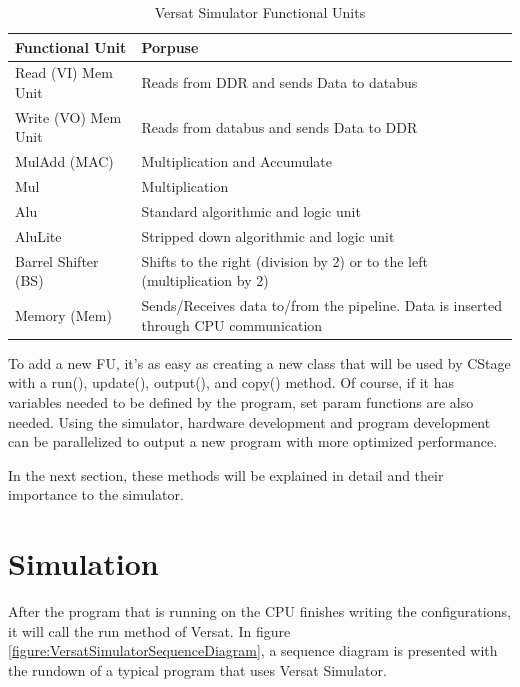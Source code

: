 \begin{table}[!htbp]
    \centering
    \begin{tabular}{|ll|}
        \hline
        \textbf{Functional Unit}     & \textbf{Porpuse}  \\  \hline
        Read (VI) Mem Unit             & Reads from DDR and sends Data to databus            \\ \hline
        Write (VO) Mem Unit & Reads from databus and sends Data to DDR             \\ \hline
        MulAdd (MAC)    & Multiplication and Accumulate          \\ \hline
		Mul    & Multiplication     \\ \hline
		Alu    & Standard algorithmic and logic unit     \\ \hline
		AluLite    & Stripped down  algorithmic and logic unit     \\ \hline
		Barrel Shifter (BS) & Shifts to the right (division by 2) or to the left (multiplication by 2) \\ \hline
		Memory (Mem) & Sends/Receives data to/from the pipeline. Data is inserted through CPU communication   \\ \hline
        \end{tabular}
    \caption{Versat Simulator Functional Units}
    \label{table:versatsimfu}
    \end{table}

To add a new FU, it's as easy as creating a new class that will be used by CStage with
a run(), update(), output(), and copy() method. Of course, if it has variables needed to be defined
by the program, set param functions are also needed. Using the simulator, hardware development
and program development can be parallelized to output a new program 
with more optimized performance.

In the next section, these methods will be explained in detail and 
their importance to the simulator.

\section{Simulation}

After the program that is running on the CPU finishes writing the configurations, it will call the run method of Versat.
In figure \ref{figure:VersatSimulatorSequenceDiagram}, a sequence diagram is presented with the rundown
of a typical program that uses Versat Simulator.

